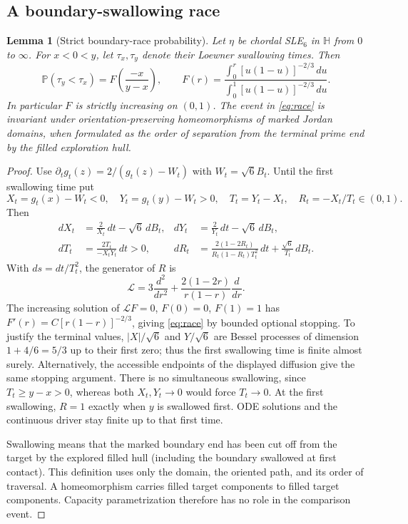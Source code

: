 \documentclass[11pt]{article}
\newtheorem{lemma}[theorem]{Lemma}
\theoremstyle{definition}\newtheorem{definition}[theorem]{Definition}
\theoremstyle{remark}\newtheorem{remark}[theorem]{Remark}
\newcommand{\HH}{\mathbb H}
\begin{document}
\subsection{A boundary-swallowing race}

\begin{lemma}[Strict boundary-race probability]
\label{lem:race}
Let $\eta$ be chordal SLE$_6$ in $\HH$ from $0$ to $\infty$. For
$x<0<y$, let $\tau_x,\tau_y$ denote their Loewner swallowing times. Then
\begin{equation}
 \mathbb P(\tau_y<\tau_x)=F\left(\frac{-x}{y-x}\right),\qquad
 F(r)=\frac{\int_0^r[u(1-u)]^{-2/3}\,du}
 {\int_0^1[u(1-u)]^{-2/3}\,du}.
 \label{eq:race}
\end{equation}
In particular $F$ is strictly increasing on $(0,1)$. The event in
\eqref{eq:race} is invariant under orientation-preserving homeomorphisms of
marked Jordan domains, when formulated as the order of separation from
the terminal prime end by the filled exploration hull.
\end{lemma}

\begin{proof}
Use $\partial_tg_t(z)=2/(g_t(z)-W_t)$ with $W_t=\sqrt6 B_t$. Until the
first swallowing time put
\[
 X_t=g_t(x)-W_t<0,\quad Y_t=g_t(y)-W_t>0,\quad
 T_t=Y_t-X_t,\quad R_t=-X_t/T_t\in(0,1).
\]
Then
\begin{align*}
 dX_t&=\frac{2}{X_t}\,dt-\sqrt6\,dB_t,&
 dY_t&=\frac{2}{Y_t}\,dt-\sqrt6\,dB_t,\\
 dT_t&=\frac{2T_t}{-X_tY_t}\,dt>0,&
 dR_t&=\frac{2(1-2R_t)}{R_t(1-R_t)T_t^2}\,dt
                 +\frac{\sqrt6}{T_t}\,dB_t.
\end{align*}
With $ds=dt/T_t^2$, the generator of $R$ is
\[
 \mathcal L=3\frac{d^2}{dr^2}
       +\frac{2(1-2r)}{r(1-r)}\frac d{dr}.
\]
The increasing solution of $\mathcal LF=0$, $F(0)=0$, $F(1)=1$ has
$F'(r)=C[r(1-r)]^{-2/3}$, giving \eqref{eq:race} by bounded optional
stopping. To justify the terminal values, $|X|/\sqrt6$ and $Y/\sqrt6$
are Bessel processes of dimension $1+4/6=5/3$ up to their first zero;
thus the first swallowing time is finite almost surely. Alternatively,
the accessible endpoints of the displayed diffusion give the same stopping
argument. There is no simultaneous swallowing, since $T_t\geq y-x>0$,
whereas both $X_t,Y_t\to0$ would force $T_t\to0$. At the first swallowing,
$R=1$ exactly when $y$ is swallowed first. ODE solutions and the continuous
driver stay finite up to that first time.

Swallowing means that the marked boundary end has been cut off from the
target by the explored filled hull (including the boundary swallowed at
first contact). This definition uses only the domain, the oriented path,
and its order of traversal. A homeomorphism carries filled target
components to filled target components. Capacity parametrization therefore
has no role in the comparison event.
\end{proof}
\end{document}

